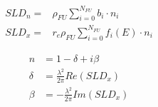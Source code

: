 



    \begin{align*}
        SLD_{n} =& \rho_{FU} \sum\limits_{i=0}^{N_{FU}} b_i \cdot n_i \\
        SLD_{x} =& r_e \rho_{FU} \sum\limits_{i=0}^{N_{FU}} f_i(E) \cdot n_i
    \end{align*}

    \begin{align*}
         n &= 1 - \delta + i \beta \\
        \delta &= \frac{\lambda^2}{2\pi} Re(SLD_{x}) \\
        \beta &= -\frac{\lambda^2}{2\pi} Im(SLD_{x})
    \end{align*}


